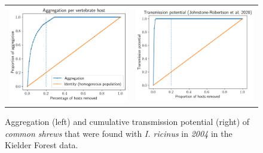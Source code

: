 \documentclass[hidelinks]{article}
\begin{document}
\begin{figure}[]
	\begin{mdframed}[backgroundcolor=grey250,rightline=false,leftline=false,topline=false]
	\centering
	\begin{tabular}{ll}
		\includegraphics[width=.48\linewidth,valign=m]{lorenz_aggregation_SA_2004_I.Ricinus} & \includegraphics[width=.48\linewidth,valign=m]{lorenz_JR_SA_2004_I.Ricinus} \\
	\end{tabular}
	\caption{Aggregation (left) and cumulative transmission potential (right) of \textit{common shrews} that were found with \textit{I.  ricinus} in \textit{2004} in the Kielder Forest data.}
	\label{fig:lorenz_2004_iricinus_SA}
	\end{mdframed}
\end{figure}
\end{document}

